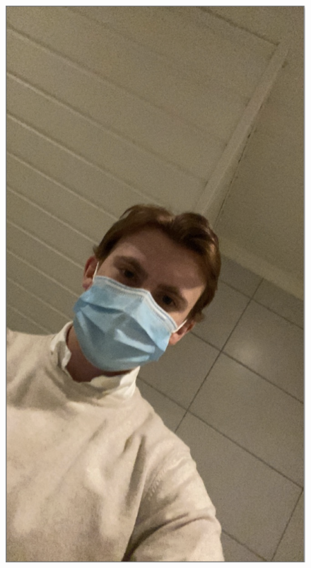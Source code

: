 \begin{figure}[h]
        {\includegraphics[scale = 0.2]{figures/0129.png}\hspace{0.4cm}}
    \subfloat

\end{figure}
